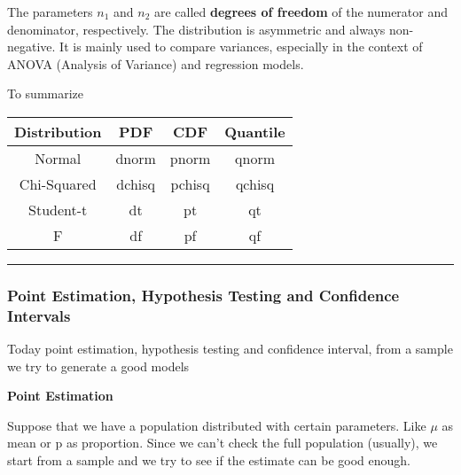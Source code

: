 The parameters $n_1$ and $n_2$ are called \textbf{degrees of freedom} of the numerator and denominator, respectively.  
The distribution is asymmetric and always non-negative.  
It is mainly used to compare variances, especially in the context of ANOVA (Analysis of Variance) and regression models.


\vspace{10pt}

To summarize

\begin{table}[h]
    \centering
    \begin{tabular}{|c|c|c|c|} %
        \hline %
        \textbf{Distribution} & \textbf{PDF}  & \textbf{CDF}  & \textbf{Quantile} \\
        \hline %
        Normal & dnorm & pnorm & qnorm \\
        \hline
        Chi-Squared & dchisq & pchisq & qchisq \\
        \hline
        Student-t & dt & pt & qt \\
        \hline
        F & df & pf & qf \\
        \hline %
    \end{tabular}
    \label{tab:distributions}
\end{table}

\vspace{10pt}

\hrule

\vspace{10pt}




\subsubsection{Point Estimation, Hypothesis Testing and Confidence Intervals}

Today point estimation, hypothesis testing and confidence interval, from a sample we try to generate a good models

\vspace{10pt}

\textbf{Point Estimation}

Suppose that we have a population distributed with certain parameters. Like $\mu$ as mean or p as proportion.
Since we can't check the full population (usually), we start from a sample and we try to see if the estimate can be good enough.

